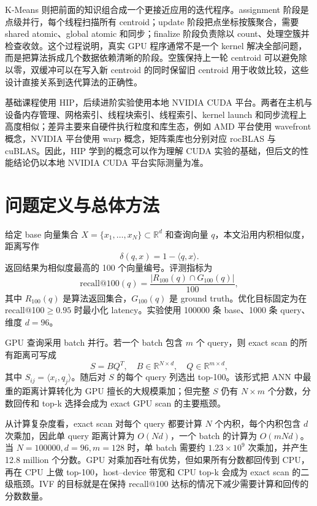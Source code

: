 \documentclass[10pt,a4paper]{article}
\begin{document}
K-Means 则把前面的知识组合成一个更接近应用的迭代程序。assignment 阶段是点级并行，每个线程扫描所有 centroid；update 阶段把点坐标按簇聚合，需要 shared atomic、global atomic 和同步；finalize 阶段负责除以 count、处理空簇并检查收敛。这个过程说明，真实 GPU 程序通常不是一个 kernel 解决全部问题，而是把算法拆成几个数据依赖清晰的阶段。空簇保持上一轮 centroid 可以避免除以零，双缓冲可以在写入新 centroid 的同时保留旧 centroid 用于收敛比较，这些设计直接关系到迭代算法的正确性。

基础课程使用 HIP，后续进阶实验使用本地 NVIDIA CUDA 平台。两者在主机与设备内存管理、网格索引、线程块索引、线程索引、kernel launch 和同步流程上高度相似；差异主要来自硬件执行粒度和库生态，例如 AMD 平台使用 wavefront 概念，NVIDIA 平台使用 warp 概念，矩阵乘库也分别对应 rocBLAS 与 cuBLAS。因此，HIP 学到的概念可以作为理解 CUDA 实验的基础，但后文的性能结论仍以本地 NVIDIA CUDA 平台实际测量为准。

\section{问题定义与总体方法}

给定 base 向量集合 $X=\{x_1,\ldots,x_N\}\subset\mathbb{R}^{d}$ 和查询向量 $q$，本文沿用内积相似度，距离写作
\begin{equation}
    \delta(q,x)=1-\langle q,x\rangle .
\end{equation}
返回结果为相似度最高的 100 个向量编号。评测指标为
\begin{equation}
    \mathrm{recall@100}(q)=\frac{|R_{100}(q)\cap G_{100}(q)|}{100},
\end{equation}
其中 $R_{100}(q)$ 是算法返回集合，$G_{100}(q)$ 是 ground truth。优化目标固定为在 recall@100$\ge0.95$ 时最小化 latency。实验使用 100000 条 base、1000 条 query、维度 $d=96$。

GPU 查询采用 batch 并行。若一个 batch 包含 $m$ 个 query，则 exact scan 的所有距离可写成
\begin{equation}
    S = B Q^{T},\quad B\in\mathbb{R}^{N\times d},\quad Q\in\mathbb{R}^{m\times d},
\end{equation}
其中 $S_{ij}=\langle x_i,q_j\rangle$。随后对 $S$ 的每个 query 列选出 top-100。该形式把 ANN 中最重的距离计算转化为 GPU 擅长的大规模乘加；但完整 $S$ 仍有 $N\times m$ 个分数，分数回传和 top-k 选择会成为 exact GPU scan 的主要瓶颈。

从计算复杂度看，exact scan 对每个 query 都要计算 $N$ 个内积，每个内积包含 $d$ 次乘加，因此单 query 距离计算为 $O(Nd)$，一个 batch 的计算为 $O(mNd)$。当 $N=100000,d=96,m=128$ 时，单 batch 需要约 $1.23\times10^9$ 次乘加，并产生 12.8 million 个分数。GPU 对乘加吞吐有优势，但如果所有分数都回传到 CPU，再在 CPU 上做 top-100，host--device 带宽和 CPU top-k 会成为 exact scan 的二级瓶颈。IVF 的目标就是在保持 recall@100 达标的情况下减少需要计算和回传的分数数量。
\end{document}
